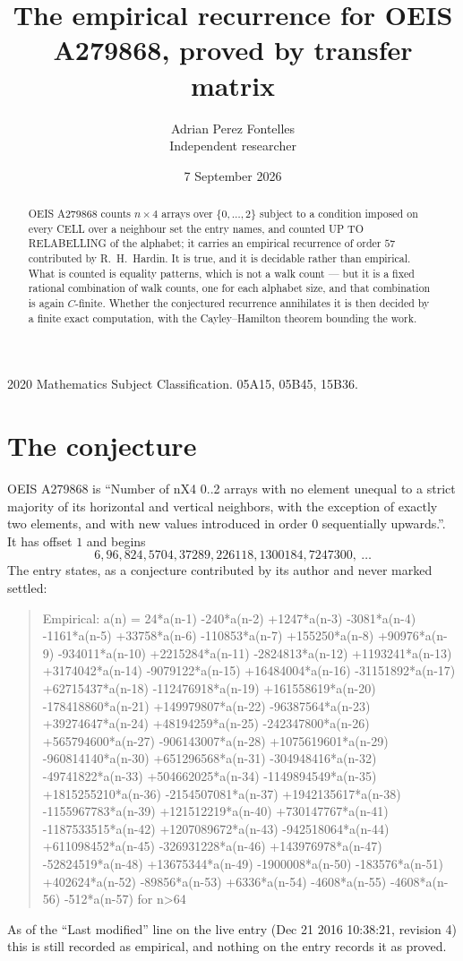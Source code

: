 \documentclass[11pt,a4paper]{article}
\title{The empirical recurrence for OEIS A279868, proved by transfer matrix}
\author{Adrian Perez Fontelles\\ \small Independent researcher}
\date{7 September 2026}
\theoremstyle{plain}
\theoremstyle{definition}
\begin{document}
\maketitle

\begin{abstract}
OEIS A279868 counts $n\times4$ arrays over $\{0,\dots,2\}$ subject to a condition imposed on
every CELL over a neighbour set the entry names, and counted UP TO RELABELLING of the
alphabet; it carries an empirical recurrence of order $57$ contributed by
R.~H.~Hardin. It is true, and it is decidable rather than empirical. What is counted is
equality patterns, which is not a walk count --- but it is a fixed rational combination of
walk counts, one for each alphabet size, and that combination is again $C$-finite. Whether the
conjectured recurrence annihilates it is then decided by a finite exact computation, with the
Cayley--Hamilton theorem bounding the work.
\end{abstract}

\noindent\small 2020 Mathematics Subject Classification. 05A15, 05B45, 15B36.\normalsize

\section{The conjecture}

OEIS A279868 is ``Number of nX4 0..2 arrays with no element unequal to a strict majority of its horizontal and vertical neighbors, with the exception of exactly two elements, and with new values introduced in order 0 sequentially upwards.''. It has offset $1$ and begins
\[
6, 96, 824, 5704, 37289, 226118, 1300184, 7247300,\ \dots
\]
The entry states, as a conjecture contributed by its author and never marked settled:
\begin{quote}
Empirical: a(n) = 24*a(n-1) -240*a(n-2) +1247*a(n-3) -3081*a(n-4) -1161*a(n-5) +33758*a(n-6) -110853*a(n-7) +155250*a(n-8) +90976*a(n-9) -934011*a(n-10) +2215284*a(n-11) -2824813*a(n-12) +1193241*a(n-13) +3174042*a(n-14) -9079122*a(n-15) +16484004*a(n-16) -31151892*a(n-17) +62715437*a(n-18) -112476918*a(n-19) +161558619*a(n-20) -178418860*a(n-21) +149979807*a(n-22) -96387564*a(n-23) +39274647*a(n-24) +48194259*a(n-25) -242347800*a(n-26) +565794600*a(n-27) -906143007*a(n-28) +1075619601*a(n-29) -960814140*a(n-30) +651296568*a(n-31) -304948416*a(n-32) -49741822*a(n-33) +504662025*a(n-34) -1149894549*a(n-35) +1815255210*a(n-36) -2154507081*a(n-37) +1942135617*a(n-38) -1155967783*a(n-39) +121512219*a(n-40) +730147767*a(n-41) -1187533515*a(n-42) +1207089672*a(n-43) -942518064*a(n-44) +611098452*a(n-45) -326931228*a(n-46) +143976978*a(n-47) -52824519*a(n-48) +13675344*a(n-49) -1900008*a(n-50) -183576*a(n-51) +402624*a(n-52) -89856*a(n-53) +6336*a(n-54) -4608*a(n-55) -4608*a(n-56) -512*a(n-57) for n>64
\end{quote}
As of the ``Last modified'' line on the live entry (Dec 21 2016 10:38:21, revision 4) this is still
recorded as empirical, and nothing on the entry records it as proved.
\end{document}
